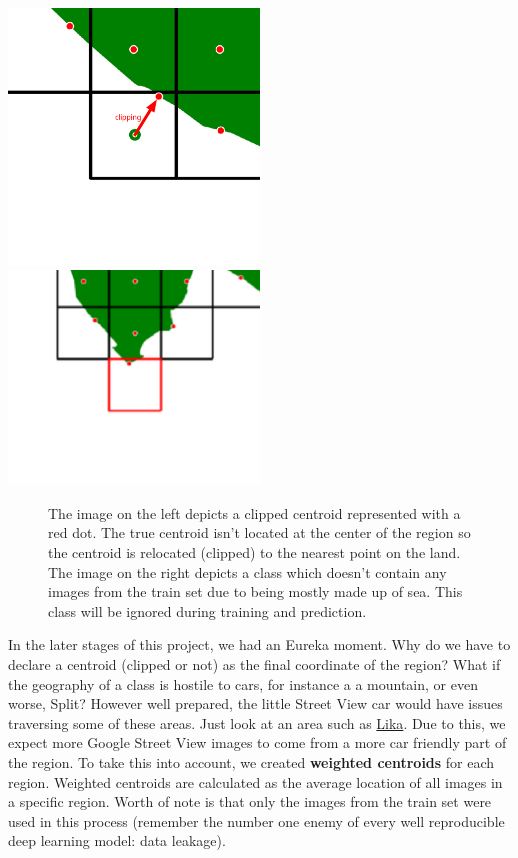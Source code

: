 \documentclass[]{article}
\begin{document}
\includegraphics[width=0.5\textwidth,height=\textheight]{./tex2pdf.-3ffa51a14b505aec/a53db3260bc0c6718f9acd4ba94fbd17b416a0f5.png}
\includegraphics[width=0.5\textwidth,height=\textheight]{./tex2pdf.-3ffa51a14b505aec/d1489042ba4d42639817aa6e11fe46e60186b245.png}

\begin{figure}[!h]
\caption{The image on the left depicts a clipped centroid represented with a red dot. The true centroid isn't located at the center of the region so the centroid is relocated (clipped) to the nearest point on the land. The image on the right depicts a class which doesn’t contain any images from the train set due to being mostly made up of sea. This class will be ignored during training and prediction.}
\end{figure}

In the later stages of this project, we had an Eureka moment. Why do we
have to declare a centroid (clipped or not) as the final coordinate of
the region? What if the geography of a class is hostile to cars, for
instance a a mountain, or even worse, Split? However well prepared, the
little Street View car would have issues traversing some of these areas.
Just look at an area such as
\href{https://www.google.com/maps/@44.7471723,15.2368329,9.25z/data=!5m1!1e4}{Lika}.
Due to this, we expect more Google Street View images to come from a
more car friendly part of the region. To take this into account, we
created \textbf{weighted centroids} for each region. Weighted centroids
are calculated as the average location of all images in a specific
region. Worth of note is that only the images from the train set were
used in this process (remember the number one enemy of every well
reproducible deep learning model: data leakage).
\end{document}
